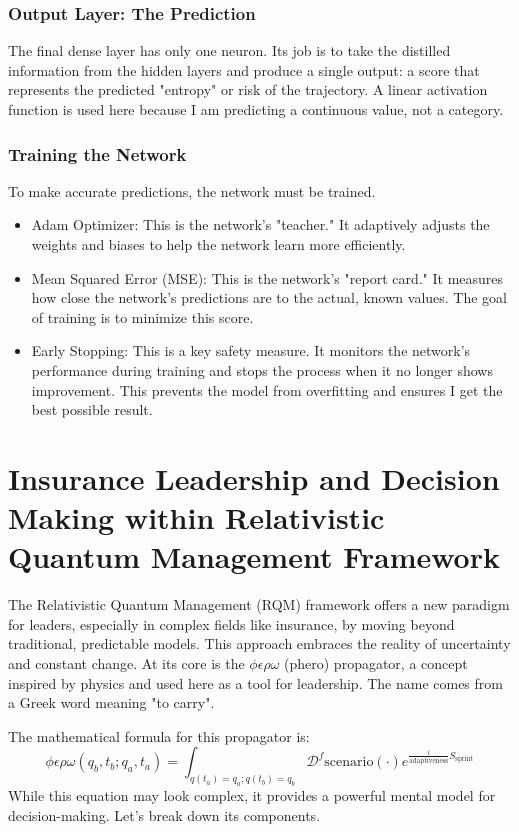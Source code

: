 \documentclass{article}
\begin{document}
\subsubsection*{Output Layer: The Prediction}
The final dense layer has only one neuron. Its job is to take the distilled information from the hidden layers and produce a single output: a score that represents the predicted "entropy" or risk of the trajectory. A linear activation function is used here because I am predicting a continuous value, not a category.

\subsubsection*{Training the Network}
To make accurate predictions, the network must be trained.
\begin{itemize}
\item Adam Optimizer: This is the network's "teacher." It adaptively adjusts the weights and biases to help the network learn more efficiently.
\item Mean Squared Error (MSE): This is the network's "report card." It measures how close the network's predictions are to the actual, known values. The goal of training is to minimize this score.
\item Early Stopping: This is a key safety measure. It monitors the network's performance during training and stops the process when it no longer shows improvement. This prevents the model from overfitting and ensures I get the best possible result.
\end{itemize}
\newpage
\section{Insurance Leadership and Decision Making within Relativistic Quantum Management Framework}
\label{sec3}
The Relativistic Quantum Management (RQM) framework offers a new paradigm for leaders, especially in complex fields like insurance, by moving beyond traditional, predictable models. This approach embraces the reality of uncertainty and constant change. At its core is the $\phi \epsilon \rho \omega$ (phero) propagator, a concept inspired by physics and used here as a tool for leadership. The name comes from a Greek word meaning "to carry".

The mathematical formula for this propagator is:
\begin{equation}
\phi\epsilon\rho\omega(q_b, t_b; q_a, t_a) = \int_{q(t_a)=q_a; q(t_b)=q_b} \mathcal{D}^f \text{scenario}(\cdot) e^{\frac{i}{\text{adaptiveness}} S_{\text{sprint}}}
\end{equation}
While this equation may look complex, it provides a powerful mental model for decision-making. Let's break down its components.
\end{document}
